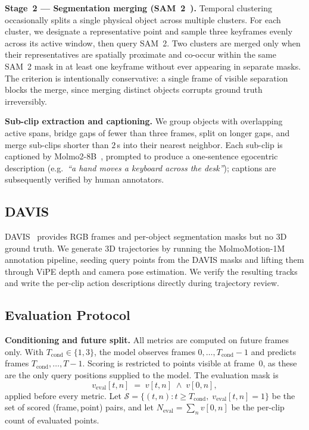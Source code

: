 \documentclass{llmxive}
\begin{document}
\noindent\textbf{Stage~2 --- Segmentation merging (SAM~2~\cite{sam2}).}
Temporal clustering occasionally splits a single physical object across
multiple clusters. For each cluster, we designate a representative point and
sample three keyframes evenly across its active window, then query SAM~2. Two
clusters are merged only when their representatives are spatially proximate
and co-occur within the same SAM~2 mask in at least one keyframe without ever
appearing in separate masks. The criterion is intentionally conservative: a
single frame of visible separation blocks the merge, since merging distinct
objects corrupts ground truth irreversibly.

\noindent\textbf{Sub-clip extraction and captioning.}
We group objects with overlapping active spans, bridge gaps of fewer than
three frames, split on longer gaps, and merge sub-clips shorter than $2$\,s
into their nearest neighbor. Each sub-clip is captioned by
Molmo2-8B~\cite{clark2026molmo2}, prompted to produce a one-sentence
egocentric description (e.g.\ \textit{``a hand moves a keyboard across the
desk''}); captions are subsequently verified by human annotators.


\subsection{DAVIS}
\label{subsec:appendix_davis}

DAVIS~\cite{davis} provides RGB frames and per-object segmentation masks but no 3D ground
truth. We generate 3D trajectories by running the MolmoMotion-1M annotation
pipeline, seeding query points from the DAVIS masks and lifting them through
ViPE depth and camera pose estimation. We verify the resulting tracks and write the per-clip action descriptions directly
during trajectory review.


\subsection{Evaluation Protocol}
\label{subsec:appendix_eval}

\noindent\textbf{Conditioning and future split.}
All metrics are computed on future frames only. With $T_\text{cond}\in\{1,3\}$,
the model observes frames $0,\ldots,T_\text{cond}-1$ and predicts frames
$T_\text{cond},\ldots,T-1$. Scoring is restricted to points visible at
frame~$0$, as these are the only query positions supplied to the model.
The evaluation mask is
\[
  v_\text{eval}[t,n] \;=\; v[t,n]\;\wedge\;v[0,n],
\]
applied before every metric. Let $\mathcal{S} = \{(t,n) : t \geq
T_\text{cond},\; v_\text{eval}[t,n]=1\}$ be the set of scored
(frame,\,point) pairs, and let $N_\text{eval} = \sum_n v[0,n]$ be the
per-clip count of evaluated points.
\end{document}
